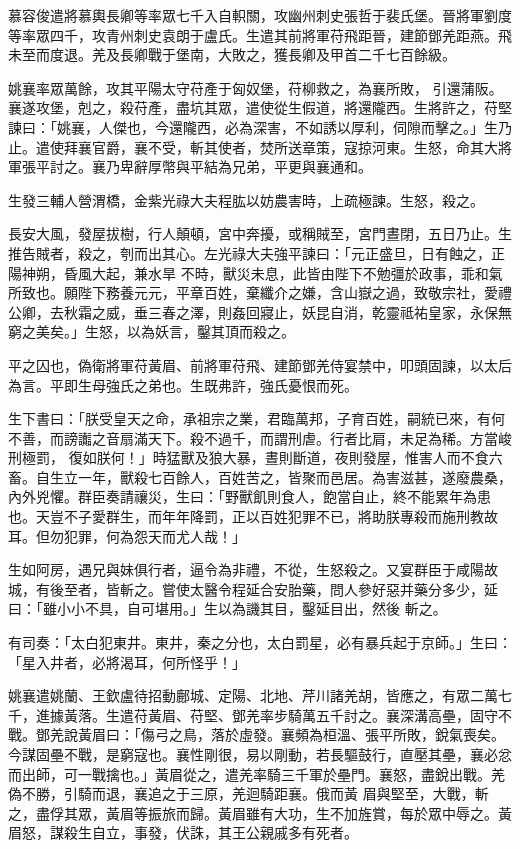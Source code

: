 \begin{pinyinscope}
 慕容俊遣將慕輿長卿等率眾七千入自軹關，攻幽州刺史張哲于裴氏堡。晉將軍劉度等率眾四千，攻青州刺史袁朗于盧氏。生遣其前將軍苻飛距晉，建節鄧羌距燕。飛未至而度退。羌及長卿戰于堡南，大敗之，獲長卿及甲首二千七百餘級。



 姚襄率眾萬餘，攻其平陽太守苻產于匈奴堡，苻柳救之，為襄所敗，
 引還蒲阪。襄遂攻堡，剋之，殺苻產，盡坑其眾，遣使從生假道，將還隴西。生將許之，苻堅諫曰：「姚襄，人傑也，今還隴西，必為深害，不如誘以厚利，伺隙而擊之。」生乃止。遣使拜襄官爵，襄不受，斬其使者，焚所送章策，寇掠河東。生怒，命其大將軍張平討之。襄乃卑辭厚幣與平結為兄弟，平更與襄通和。



 生發三輔人營渭橋，金紫光祿大夫程肱以妨農害時，上疏極諫。生怒，殺之。



 長安大風，發屋拔樹，行人顛頓，宮中奔擾，或稱賊至，宮門晝閉，五日乃止。生推告賊者，殺之，刳而出其心。左光祿大夫強平諫曰：「元正盛旦，日有蝕之，正陽神朔，昏風大起，兼水旱
 不時，獸災未息，此皆由陛下不勉彊於政事，乖和氣所致也。願陛下務養元元，平章百姓，棄纖介之嫌，含山嶽之過，致敬宗社，愛禮公卿，去秋霜之威，垂三春之澤，則姦回寢止，妖昆自消，乾靈祗祐皇家，永保無窮之美矣。」生怒，以為妖言，鑿其頂而殺之。



 平之囚也，偽衛將軍苻黃眉、前將軍苻飛、建節鄧羌侍宴禁中，叩頭固諫，以太后為言。平即生母強氏之弟也。生既弗許，強氏憂恨而死。



 生下書曰：「朕受皇天之命，承祖宗之業，君臨萬邦，子育百姓，嗣統已來，有何不善，而謗讟之音扇滿天下。殺不過千，而謂刑虐。行者比肩，未足為稀。方當峻刑極罰，
 復如朕何！」時猛獸及狼大暴，晝則斷道，夜則發屋，惟害人而不食六畜。自生立一年，獸殺七百餘人，百姓苦之，皆聚而邑居。為害滋甚，遂廢農桑，內外兇懼。群臣奏請禳災，生曰：「野獸飢則食人，飽當自止，終不能累年為患也。天豈不子愛群生，而年年降罰，正以百姓犯罪不已，將助朕專殺而施刑教故耳。但勿犯罪，何為怨天而尤人哉！」



 生如阿房，遇兄與妹俱行者，逼令為非禮，不從，生怒殺之。又宴群臣于咸陽故城，有後至者，皆斬之。嘗使太醫令程延合安胎藥，問人參好惡并藥分多少，延曰：「雖小小不具，自可堪用。」生以為譏其目，鑿延目出，然後
 斬之。



 有司奏：「太白犯東井。東井，秦之分也，太白罰星，必有暴兵起于京師。」生曰：「星入井者，必將渴耳，何所怪乎！」



 姚襄遣姚蘭、王欽盧待招動鄜城、定陽、北地、芹川諸羌胡，皆應之，有眾二萬七千，進據黃落。生遣苻黃眉、苻堅、鄧羌率步騎萬五千討之。襄深溝高壘，固守不戰。鄧羌說黃眉曰：「傷弓之鳥，落於虛發。襄頻為桓溫、張平所敗，銳氣喪矣。今謀固壘不戰，是窮寇也。襄性剛很，易以剛動，若長驅鼓行，直壓其壘，襄必忿而出師，可一戰擒也。」黃眉從之，遣羌率騎三千軍於壘門。襄怒，盡銳出戰。羌偽不勝，引騎而退，襄追之于三原，羌迴騎距襄。俄而黃
 眉與堅至，大戰，斬之，盡俘其眾，黃眉等振旅而歸。黃眉雖有大功，生不加旌賞，每於眾中辱之。黃眉怒，謀殺生自立，事發，伏誅，其王公親戚多有死者。




\end{pinyinscope}
